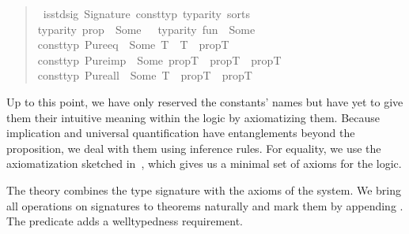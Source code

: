 \begin{quote}
\begin{isabelle}%
    \ is{\isacharunderscore}std{\isacharunderscore}sig\ {\isacharparenleft}Signature\ const{\isacharunderscore}typ\ typ{\isacharunderscore}arity\ sorts{\isacharparenright}\ {\isacharequal}\isanewline
    \isaindent{\ }{\isacharparenleft}typ{\isacharunderscore}arity\ {\isacharprime}{\isacharprime}prop{\isacharprime}{\isacharprime}\ {\isacharequal}\ Some\ {}\ {\isasymand}\ typ{\isacharunderscore}arity\ {\isacharprime}{\isacharprime}fun{\isacharprime}{\isacharprime}\ {\isacharequal}\ Some\ {}\ {\isasymand}\isanewline
    \isaindent{\ {\isacharparenleft}}const{\isacharunderscore}typ\ {\isacharprime}{\isacharprime}Pure{\isachardot}eq{\isacharprime}{\isacharprime}\ {\isacharequal}\ Some\ {\isacharparenleft}{\isasymalpha}T\ {\isasymrightarrow}\ {\isasymalpha}T\ {\isasymrightarrow}\ propT{\isacharparenright}\ {\isasymand}\isanewline
    \isaindent{\ {\isacharparenleft}}const{\isacharunderscore}typ\ {\isacharprime}{\isacharprime}Pure{\isachardot}imp{\isacharprime}{\isacharprime}\ {\isacharequal}\ Some\ {\isacharparenleft}propT\ {\isasymrightarrow}\ propT\ {\isasymrightarrow}\ propT{\isacharparenright}\ {\isasymand}\isanewline
    \isaindent{\ {\isacharparenleft}}const{\isacharunderscore}typ\ {\isacharprime}{\isacharprime}Pure{\isachardot}all{\isacharprime}{\isacharprime}\ {\isacharequal}\ Some\ {\isacharparenleft}{\isacharparenleft}{\isasymalpha}T\ {\isasymrightarrow}\ propT{\isacharparenright}\ {\isasymrightarrow}\ propT{\isacharparenright}{\isacharparenright}%
    \end{isabelle}
\end{quote}

Up to this point, we have only reserved the constants' names but have yet to give them their intuitive meaning within the logic by axiomatizing them.
Because implication and universal quantification have entanglements beyond the proposition, we deal with them using inference rules.
For equality, we use the axiomatization sketched in~\parencite{implementation}, which gives us a minimal set of axioms for the logic.


The theory combines the type signature with the axioms of the system.
We bring all operations on signatures to theorems naturally and mark them by appending .
The  predicate adds a welltypedness requirement.

